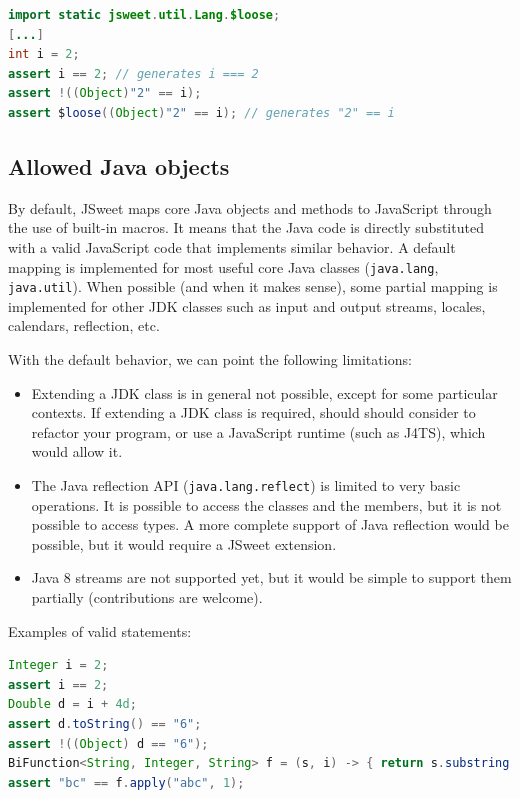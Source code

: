 \documentclass[a4paper]{report}
\begin{document}
\begin{lstlisting}[language=Java]
import static jsweet.util.Lang.$loose;
[...]
int i = 2;
assert i == 2; // generates i === 2
assert !((Object)"2" == i);
assert $loose((Object)"2" == i); // generates "2" == i
\end{lstlisting}

\subsection{Allowed Java objects}

By default, JSweet maps core Java objects and methods to JavaScript through the use of built-in macros. It means that the Java code is directly substituted with a valid JavaScript code that implements similar behavior. A default mapping is implemented for most useful core Java classes (\texttt{java.lang}, \texttt{java.util}). When possible (and when it makes sense), some partial mapping is implemented for other JDK classes such as input and output streams, locales, calendars, reflection, etc.

With the default behavior, we can point the following limitations:

\begin{itemize}
\item Extending a JDK class is in general not possible, except for some particular contexts. If extending a JDK class is required, should should consider to refactor your program, or use a JavaScript runtime (such as J4TS), which would allow it.
\item The Java reflection API (\texttt{java.lang.reflect}) is limited to very basic operations. It is possible to access the classes and the members, but it is not possible to access types. A more complete support of Java reflection would be possible, but it would require a JSweet extension.
\item Java 8 streams are not supported yet, but it would be simple to support them partially (contributions are welcome).
\end{itemize}

\noindent
Examples of valid statements:

\begin{lstlisting}[language=Java]
Integer i = 2;
assert i == 2;
Double d = i + 4d;
assert d.toString() == "6";
assert !((Object) d == "6");
BiFunction<String, Integer, String> f = (s, i) -> { return s.substring(i); };
assert "bc" == f.apply("abc", 1);
\end{lstlisting}
\end{document}
